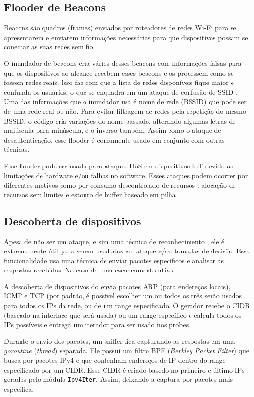 \subsection{\textbf{Flooder de Beacons}}
Beacons são quadros (frames) enviados por roteadores de redes Wi-Fi para se apresentarem e enviarem informações necessárias para que dispositivos possam se conectar as suas redes sem fio.

O inundador de beacons cria vários desses beacons com informações falsas para que os dispositivos ao alcance recebem esses beacons e os processem como se fossem redes reais. Isso faz com que a lista de redes disponíveis fique maior e confunda os usuários, o que se enquadra em um ataque de confusão de SSID \cite{confusion-attack}. Uma das informações que o inundador usa é nome de rede (BSSID) que pode ser de uma rede real ou não. Para evitar filtragem de redes pela repetição do mesmo BSSID, o código cria variações do nome passado, alterando algumas letras de maiúscula para minúscula, e o inverso também. Assim como o ataque de desautenticação, esse flooder é comumente usado em conjunto com outras técnicas.

Esse flooder pode ser usado para ataques DoS em dispositivos IoT devido as limitações de hardware e/ou falhas no software. Esses ataques podem ocorrer por diferentes motivos como por consumo descontrolado de recursos \cite{cwe400}, alocação de recursos sem limites \cite{cwe770} e estouro de buffer baseado em pilha \cite{cwe121}.



\subsection{\textbf{Descoberta de dispositivos}}
Apesa de não ser um ataque, e sim uma técnica de reconhecimento \cite{ip-scanning}, ele é extremamente útil para serem usadados em ataque e/ou tomadas de decisão. Essa funcionalidade usa uma técnica de enviar pacotes especificos e analisar as respostas recebidas. No caso de uma escaneamento ativo.

A descoberta de dispositivos do \offscan envia pacotes ARP (para endereços locais), ICMP e TCP (por padrão, é possível escolher um ou todos os três serão usados para todos os IPs da rede, ou de um range especificado. O gerador recebe o CIDR (baseado na interface que será usada) ou um range específico e calcula todos os IPs possíveis e entrega um iterador para ser usado nos probes.

Durante o envio dos pacotes, um sniffer fica capturando as respostas em uma \textit{goroutine} (\textit{thread}) separada. Ele possui um filtro BPF (\textit{Berkley Packet Filter}) que busca por pacotes IPv4 e que contenham endereços de IP dentro do range especificado por um CIDR. Esse CIDR é criado basedo no primeiro e último IPs gerados pelo módulo \texttt{Ipv4Iter}. Assim, deixando a captura por pacotes mais especifica.



